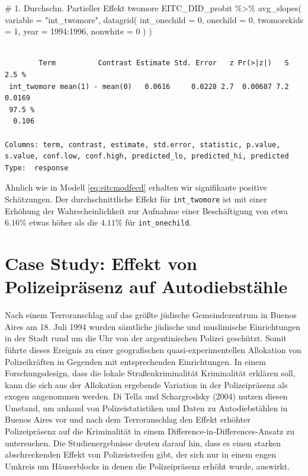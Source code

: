 \documentclass[
  a4paper,
  DIV=11,
  oneside]{scrreprt}
\newenvironment{Shaded}{\begin{snugshade}}{\end{snugshade}}
\newcommand{\AttributeTok}[1]{\textcolor[rgb]{0.40,0.45,0.13}{#1}}
\newcommand{\CommentTok}[1]{\textcolor[rgb]{0.37,0.37,0.37}{#1}}
\newcommand{\DecValTok}[1]{\textcolor[rgb]{0.68,0.00,0.00}{#1}}
\newcommand{\FunctionTok}[1]{\textcolor[rgb]{0.28,0.35,0.67}{#1}}
\newcommand{\NormalTok}[1]{\textcolor[rgb]{0.00,0.23,0.31}{#1}}
\newcommand{\SpecialCharTok}[1]{\textcolor[rgb]{0.37,0.37,0.37}{#1}}
\newcommand{\StringTok}[1]{\textcolor[rgb]{0.13,0.47,0.30}{#1}}
\begin{document}
\begin{Shaded}
\begin{Highlighting}[]
\CommentTok{\# 1. Durchschn. Partieller Effekt twomore}
\NormalTok{EITC\_DID\_probit }\SpecialCharTok{\%\textgreater{}\%} 
  \FunctionTok{avg\_slopes}\NormalTok{(}
    \AttributeTok{variable =} \StringTok{"int\_twomore"}\NormalTok{,}
    \FunctionTok{datagrid}\NormalTok{(}
      \AttributeTok{int\_onechild =} \DecValTok{0}\NormalTok{, }
      \AttributeTok{onechild =} \DecValTok{0}\NormalTok{, }
      \AttributeTok{twomorekids =} \DecValTok{1}\NormalTok{, }
      \AttributeTok{year =} \DecValTok{1994}\SpecialCharTok{:}\DecValTok{1996}\NormalTok{,}
      \AttributeTok{nonwhite =} \DecValTok{0}
\NormalTok{    )}
\NormalTok{  )}
\end{Highlighting}
\end{Shaded}

\begin{verbatim}

        Term          Contrast Estimate Std. Error   z Pr(>|z|)   S  2.5 %
 int_twomore mean(1) - mean(0)   0.0616     0.0228 2.7  0.00687 7.2 0.0169
 97.5 %
  0.106

Columns: term, contrast, estimate, std.error, statistic, p.value, s.value, conf.low, conf.high, predicted_lo, predicted_hi, predicted 
Type:  response 
\end{verbatim}

Ähnlich wie in Modell \eqref{eq:eitcmodfecd} erhalten wir signifikante
positive Schätzungen. Der durchschnittliche Effekt für
\texttt{int\_twomore} ist mit einer Erhöhung der Wahrscheinlichkeit zur
Aufnahme einer Beschäftigung von etwa \(6.16\%\) etwas höher als die
\(4.11\%\) für \texttt{int\_onechild}.

\section{Case Study: Effekt von Polizeipräsenz auf
Autodiebstähle}\label{case-study-effekt-von-polizeipruxe4senz-auf-autodiebstuxe4hle}

Nach einem Terroranschlag auf das größte jüdische Gemeindezentrum in
Buenos Aires am 18. Juli 1994 wurden sämtliche jüdische und muslimische
Einrichtungen in der Stadt rund um die Uhr von der argentinischen
Polizei geschützt. Somit führte dieses Ereignis zu einer geografischen
quasi-experimentellen Allokation von Polizeikräften in Gegenden mit
entsprechenden Einrichtungen. In einem Forschungsdesign, dass die lokale
Straßenkriminalität Kriminalität erklären soll, kann die sich aus der
Allokation ergebende Variation in der Polizeipräsenz als exogen
angenommen werden. Di Tella und Schargrodsky (2004) nutzen diesen
Umstand, um anhand von Polizeistatistiken und Daten zu Autodiebstählen
in Buenos Aires vor und nach dem Terroranschlag den Effekt erhöhter
Polizeipräsenz auf die Kriminalität in einem
Difference-in-Differences-Ansatz zu untersuchen. Die Studienergebnisse
deuten darauf hin, dass es einen starken abschreckenden Effekt von
Polizeistreifen gibt, der sich nur in einem engen Umkreis um
Häuserblocks in denen die Polizeipräsenz erhöht wurde, auswirkt.
\end{document}
